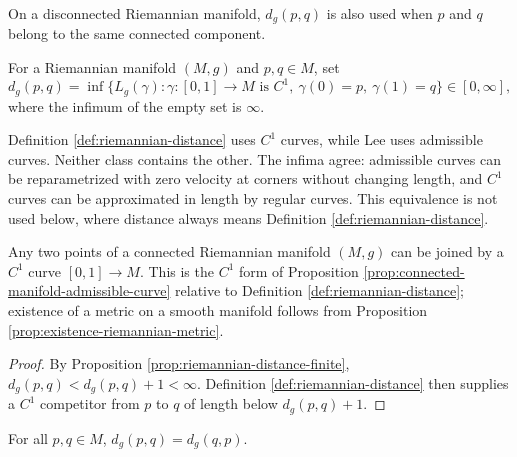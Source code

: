 On a disconnected Riemannian manifold, $d_g(p,q)$ is also used when $p$ and $q$ belong to the same connected component.

\begin{definition}
\label{def:riemannian-distance}
\mathlibok
{}
For a Riemannian manifold $(M,g)$ and $p,q\in M$, set
\[
d_g(p,q)=\inf\{L_g(\gamma):\gamma:[0,1]\to M\text{ is }C^1,\ \gamma(0)=p,\ \gamma(1)=q\}\in[0,\infty],
\]
where the infimum of the empty set is $\infty$.
\end{definition}

\begin{remark}
\label{rem:riemannian-distance-c1-vs-admissible}
Definition \ref{def:riemannian-distance} uses $C^1$ curves, while Lee uses admissible curves. Neither class contains the other. The infima agree: admissible curves can be reparametrized with zero velocity at corners without changing length, and $C^1$ curves can be approximated in length by regular curves. This equivalence is not used below, where distance always means Definition \ref{def:riemannian-distance}.
\end{remark}

\begin{proposition}
\label{prop:connected-manifold-c1-curve}
\leanok
{}
Any two points of a connected Riemannian manifold $(M,g)$ can be joined by a $C^1$ curve $[0,1]\to M$. This is the $C^1$ form of Proposition \ref{prop:connected-manifold-admissible-curve} relative to Definition \ref{def:riemannian-distance}; existence of a metric on a smooth manifold follows from Proposition \ref{prop:existence-riemannian-metric}.
\end{proposition}
\begin{proof}
\leanok
{}
\sketch By Proposition \ref{prop:riemannian-distance-finite}, $d_g(p,q)<d_g(p,q)+1<\infty$. Definition \ref{def:riemannian-distance} then supplies a $C^1$ competitor from $p$ to $q$ of length below $d_g(p,q)+1$.
\end{proof}

\begin{lemma}
\label{lem:riemannian-distance-symm}
\mathlibok
{}
For all $p,q\in M$, $d_g(p,q)=d_g(q,p)$.
\end{lemma}

